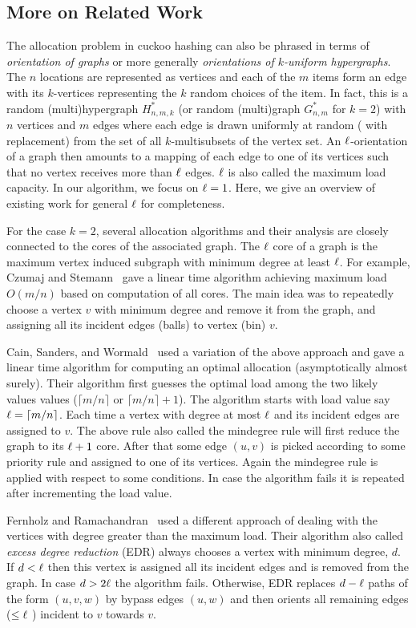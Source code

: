 \subsection{More on Related Work}
The allocation problem in cuckoo hashing can also be phrased in terms of \emph{orientation of graphs} or more generally \emph{orientations of $k$-uniform hypergraphs}. The $n$ locations are represented as vertices and each of the $m$ items form an edge with its $k$-vertices representing the $k$ random choices of the item.
In fact, this is a random (multi)hypergraph $H^*_{n,m,k}$ (or random (multi)graph $G^*_{n,m}$ for $k=2$) with $n$ vertices and $m$ edges where each edge is drawn uniformly at random ( with replacement) from the set of all $k$-multisubsets of the vertex set. An $\ell$-orientation of a graph then amounts to a mapping of each edge to one of its vertices such that no vertex receives more than $\ell$ edges. $\ell$ is also called the maximum load capacity. In our algorithm, we focus on $\ell=1$. Here, we give an overview of existing work for general $\ell$ for completeness.

For the case $k = 2$, several allocation algorithms and their analysis are closely connected to the cores of the associated
graph. The $\ell$ core of a graph is the maximum vertex induced subgraph with minimum degree at least $\ell$. 
For example, Czumaj and Stemann~\cite{ina:cs01} gave a linear time algorithm achieving maximum load $O(m/n)$ based on computation of all cores. The main idea was to repeatedly choose a
vertex $v$ with minimum degree and remove it from the
graph, and assigning all its incident edges (balls) to vertex (bin) $v$. 

Cain, Sanders, and Wormald~\cite{1283433}  used a variation of the above approach and gave a linear time algorithm for computing an optimal allocation (asymptotically almost surely). Their algorithm first guesses the optimal load among the two likely values values ($\lceil m/n\rceil $ or $\lceil m/n\rceil +1$). The algorithm starts with load value say $\ell=\lceil m/n\rceil $. Each time a vertex with degree at most $\ell$ and its incident edges are assigned to $v$. The above rule also called the mindegree rule will first reduce the graph to its $\ell+1$ core. After that some edge $(u,v)$ is picked according to some priority rule and assigned to one of its vertices. Again the mindegree rule is applied with respect to some conditions. In case the algorithm fails it is repeated after incrementing the load value.

Fernholz and Ramachandran~\cite{1283432} used a different approach of dealing with the vertices with degree greater than the maximum load.  Their algorithm also called \emph{excess degree reduction} (EDR) always chooses a vertex with minimum degree, $d$. If $d<\ell$ then this vertex is assigned all its incident edges and is removed from the graph. In case $d>2\ell$ the algorithm fails. Otherwise, EDR replaces $d-\ell$ paths of the form
$(u, v, w)$ by bypass edges $(u, w)$ and then orients all remaining edges ($\le \ell$ ) incident to $v$
towards $v$.

